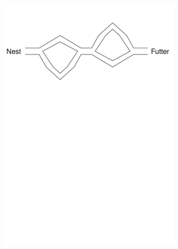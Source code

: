 \documentclass[pdftex,
               12pt,
               DIV=12,
               a4paper,
               twoside,
               parskip=half,
               abstract=true,
               dvipsnames]{scrartcl}
\begin{document}
\begin{figure}[h]
\begin{subfigure}{0.45\textwidth}
		\includegraphics[width=\linewidth, page=3]{aco_biology}
		\caption{} \label{subfig:ACO_biologie_b}
	\end{subfigure}
	\begin{subfigure}{0.45\textwidth}

\end{subfigure}
\end{figure}
\end{document}
